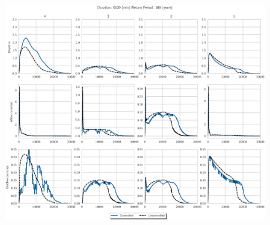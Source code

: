 \begin{figure}
    \centering
    \includegraphics[width=\linewidth]{./RL-SI-figures/77storms/0120100.eps}
\end{figure}



